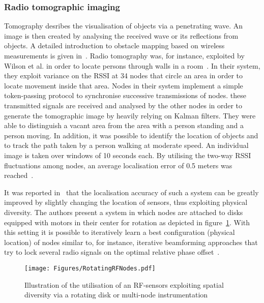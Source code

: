 \documentclass[journal]{IEEEtran}
\begin{document}
\begin{figure*}
\subsubsection{Radio tomographic imaging}
Tomography desribes the visualisation of objects via a penetrating wave.
An image is then created by analysing the received wave or its reflections from objects.
A detailed introduction to obstacle mapping based on wireless measurements is given in~\cite{RFSensing_Mostofi_2013b,RFSensing_Mostofi_2011}.
Radio tomography was, for instance, exploited by Wilson et al. in order to locate persons through walls in a room~\cite{RFSensing_Wilson_2009}.
In their system, they exploit variance on the RSSI at 34 nodes that circle an area in order to locate movement inside that area.
Nodes in their system implement a simple token-passing protocol to synchronise successive transmissions of nodes.
these transmitted signals are received and analysed by the other nodes in order to generate the tomographic image by heavily relying on Kalman filters.
They were able to distinguish a vacant area from the area with a person standing and a person moving. 
In addition, it was possible to identify the location of objects and to track the path taken by a person walking at moderate speed.
An individual image is taken over windows of 10 seconds each.
By utilising the two-way RSSI fluctuations among nodes, an average localisation error of 0.5 meters was reached~\cite{RFSensing_Wilson_2010}.

It was reported in~\cite{RFSensing_Bocca_2013} that the localisation accuracy of such a system can be greatly improved by slightly changing the location of sensors, thus exploiting physical diversity.
The authors present a system in which nodes are attached to disks equipped with motors in their center for rotation as depicted in figure~\ref{figureRotatingNodes}. 
With this setting it is possible to iteratively learn a best configuration (physical location) of nodes similar to, for instance, iterative beamforming approaches that try to lock several radio signals on the optimal relative phase offset~\cite{4022,DistributedBeamforming_Quitin_2013}.
\begin{figure}
 \centering
 \texttt{[image: Figures/RotatingRFNodes.pdf]}
 \caption{Illustration of the utilisation of an RF-sensors exploiting spatial diversity via a rotating disk or multi-node instrumentation~\cite{RFSensing_Bocca_2013}}
 \label{figureRotatingNodes}
\end{figure}


\end{figure*}
\end{document}
